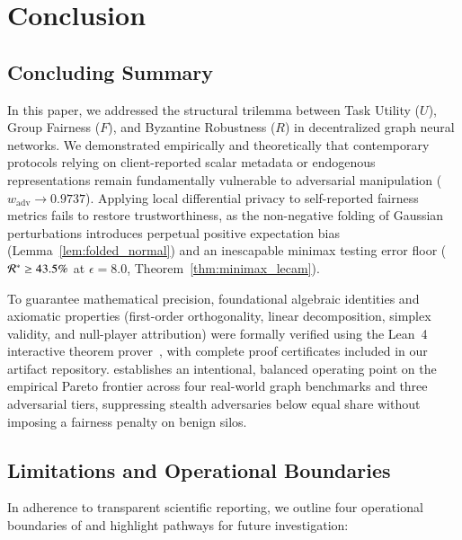 \section{Conclusion}
\label{sec:conclusion}

\subsection{Concluding Summary}
\label{subsec:conclusion_summary}
In this paper, we addressed the structural trilemma between Task Utility ($U$), Group Fairness ($F$), and Byzantine Robustness ($R$) in decentralized graph neural networks. We demonstrated empirically and theoretically that contemporary protocols relying on client-reported scalar metadata or endogenous representations remain fundamentally vulnerable to adversarial manipulation ($w_{\mathrm{adv}} \to 0.9737$). Applying local differential privacy to self-reported fairness metrics fails to restore trustworthiness, as the non-negative folding of Gaussian perturbations introduces perpetual positive expectation bias (Lemma~\ref{lem:folded_normal}) and an inescapable minimax testing error floor ($\mathcal{R}^* \ge 43.5\%$ at $\epsilon = 8.0$, Theorem~\ref{thm:minimax_lecam}).

To guarantee mathematical precision, foundational algebraic identities and axiomatic properties (first-order orthogonality, linear decomposition, simplex validity, and null-player attribution) were formally verified using the Lean~4 interactive theorem prover~\citep{demoura2021lean}, with complete proof certificates included in our artifact repository. \MethodName{} establishes an intentional, balanced operating point on the empirical Pareto frontier across four real-world graph benchmarks and three adversarial tiers, suppressing stealth adversaries below equal share without imposing a fairness penalty on benign silos.

\subsection{Limitations and Operational Boundaries}
\label{subsec:conclusion_limitations}
In adherence to transparent scientific reporting, we outline four operational boundaries of \MethodName{} and highlight pathways for future investigation:

